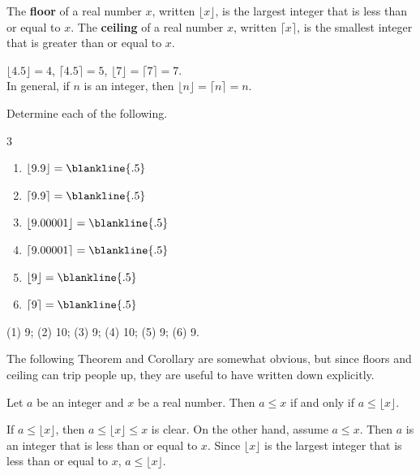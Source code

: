 \begin{df}
The {\bf floor} of a real number $x$, written $\lfloor x\rfloor$, 
is the largest integer that is less than or equal to $x$.
The {\bf ceiling} of a real number $x$, written $\lceil x\rceil$, 
is the smallest integer that is greater than or equal to $x$.
\end{df}
\begin{exa}
$\lfloor 4.5 \rfloor = 4$, 
$\lceil 4.5 \rceil = 5$, 
$\lfloor 7 \rfloor = \lceil 7 \rceil = 7$.\\
In general, if $n$ is an integer, then 
$\lfloor n \rfloor = \lceil n \rceil = n$.
\end{exa}

\begin{exer}
Determine each of the following.\\[-.35in]
\begin{multicols}{3}
\begin{enumerate}
\item $\lfloor 9.9 \rfloor = \blankline{.5}$
\item $\lceil 9.9 \rceil = \blankline{.5}$
\item $\lfloor 9.00001 \rfloor = \blankline{.5}$
\item $\lceil 9.00001 \rceil = \blankline{.5}$
\item $\lfloor 9 \rfloor = \blankline{.5}$
\item $\lceil 9 \rceil = \blankline{.5}$
\end{enumerate}
\end{multicols}
\begin{answer}
(1) 9; (2) 10; (3) 9; (4) 10; (5) 9; (6) 9.
\end{answer}
\end{exer}


The following Theorem and Corollary are somewhat 
obvious, but since floors and ceiling can trip people up,
they are useful to have written down explicitly.

\begin{thm}\label{floorThm}
Let $a$ be an integer and $x$ be a real number.  Then $a\leq x$ if and only if $a\leq \lfloor x\rfloor$.
\begin{pf}
If $a\leq \lfloor x\rfloor$, then $a\leq \lfloor x\rfloor\leq x$ is clear.
On the other hand, assume $a \leq x$.  Then $a$ is an integer that is less than or equal to $x$.
Since $\lfloor x\rfloor$ is the largest integer that is less than or equal to $x$,
$a\leq \lfloor x \rfloor$.
\end{pf}
\end{thm}


